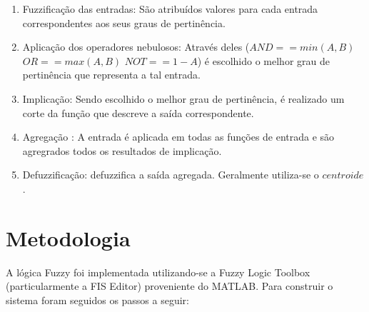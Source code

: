 \documentclass[conference]{IEEEtran}
\begin{document}
   \begin{enumerate}
	 \item Fuzzifica\c{c}\~ao das entradas: S\~ao atribu\'idos valores para cada entrada correspondentes aos seus graus de pertin\^encia.
  	\item Aplica\c{c}\~ao dos operadores nebulosos: Atrav\'es deles ($AND==min(A,B)$ $OR==max(A,B)$  $NOT==1-A$) \'e escolhido o melhor grau de pertin\^encia que representa a tal entrada.
  	\item Implica\c{c}\~ao: Sendo escolhido o melhor grau de pertin\^encia, \'e realizado um corte da fun\c{c}\~ao que descreve a sa\'ida correspondente.
  	\item Agrega\c{c}\~ao : A entrada \'e aplicada em todas as fun\c{c}\~oes de entrada e s\~ao agregrados todos os resultados de implica\c{c}\~ao.
  	\item Defuzzifica\c{c}\~ao: defuzzifica a sa\'ida agregada. Geralmente utiliza-se o $centroide$.

 \end{enumerate}
 
\section{Metodologia} 
\label{sec:meth} 
A l\'ogica Fuzzy foi implementada utilizando-se a Fuzzy Logic Toolbox (particularmente a  FIS Editor) proveniente do MATLAB. Para construir o sistema foram seguidos os passos a seguir:
\end{document}
